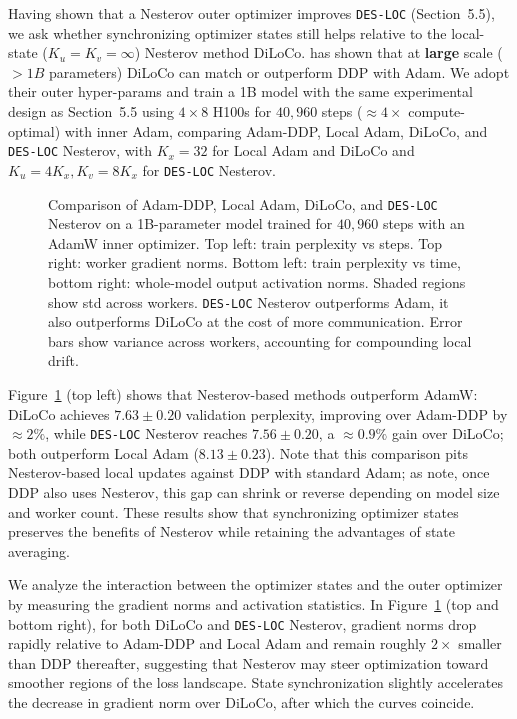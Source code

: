Having shown that a Nesterov outer optimizer improves \texttt{DES-LOC} (Section~5.5), we ask whether synchronizing optimizer states still helps relative to the local-state ($K_u=K_v=\infty$) Nesterov method DiLoCo. \citet{charles2025convergence} has shown that at \textbf{large} scale ($>1B$ parameters) DiLoCo can match or outperform DDP with Adam. We adopt their outer hyper-params and train a 1B model with the same experimental design as Section~5.5 using $4\times 8$ H100s for $40{,}960$ steps ($\approx 4\times$ compute-optimal) with inner Adam, comparing Adam-DDP, Local Adam, DiLoCo, and \texttt{DES-LOC} Nesterov, with $K_x=32$ for Local Adam and DiLoCo and $K_u=4K_x, K_v=8K_x$ for \texttt{DES-LOC} Nesterov.

\begin{figure}[t]
\centering
\caption{Comparison of Adam-DDP, Local Adam, DiLoCo, and \texttt{DES-LOC} Nesterov on a 1B-parameter model trained for $40{,}960$ steps with an AdamW inner optimizer. Top left: train perplexity vs steps. Top right: worker gradient norms. Bottom left: train perplexity vs time, bottom right: whole-model output activation norms. Shaded regions show std across workers. \texttt{DES-LOC} Nesterov outperforms Adam, it also outperforms DiLoCo at the cost of more communication. Error bars show variance across workers, accounting for compounding local drift.}
\label{fig:nesterov_diloco_1b}
\end{figure}

Figure~\ref{fig:nesterov_diloco_1b} (top left) shows that Nesterov-based methods outperform AdamW: DiLoCo achieves $7.63\pm 0.20$ validation perplexity, improving over Adam-DDP by $\approx 2\%$, while \texttt{DES-LOC} Nesterov reaches $7.56\pm 0.20$, a $\approx 0.9\%$ gain over DiLoCo; both outperform Local Adam ($8.13\pm 0.23$). Note that this comparison pits Nesterov-based local updates against DDP with standard Adam; as \citet{charles2025convergence} note, once DDP also uses Nesterov, this gap can shrink or reverse depending on model size and worker count. These results show that synchronizing optimizer states preserves the benefits of Nesterov while retaining the advantages of state averaging.

We analyze the interaction between the optimizer states and the outer optimizer by measuring the gradient norms and activation statistics. In Figure~\ref{fig:nesterov_diloco_1b} (top and bottom right), for both DiLoCo and \texttt{DES-LOC} Nesterov, gradient norms drop rapidly relative to Adam-DDP and Local Adam and remain roughly $2\times$ smaller than DDP thereafter, suggesting that Nesterov may steer optimization toward smoother regions of the loss landscape. State synchronization slightly accelerates the decrease in gradient norm over DiLoCo, after which the curves coincide.


